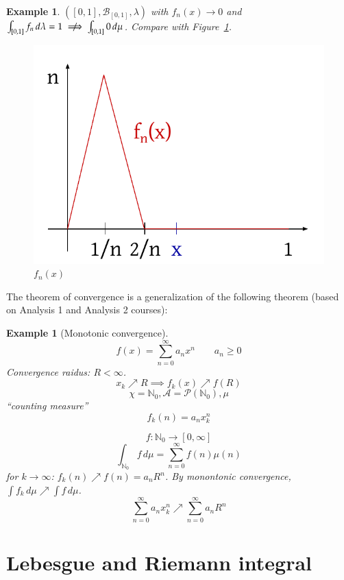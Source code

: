 \documentclass[a4paper]{article}
\newcounter{lecref}[section]
\numberwithin{lecref}{section}
\theoremstyle{break}
\newtheorem{example}[lecref]{Example}
\begin{document}
\begin{example}
  $([0, 1], \mathcal B_{[0,1]}, \lambda)$ with $f_n(x) \to 0$ and $\int_{[0,1]} f_n \, d\lambda = 1 \centernot{\implies} \int_{[0,1]} 0 \, d\mu$.
  Compare with Figure~\ref{img:exconv}.

  \begin{figure}
    \begin{center}
      \includegraphics{img/03_convergence.pdf}
      \caption{$f_n(x)$}
      \label{img:exconv}
    \end{center}
  \end{figure}
\end{example}

The theorem of convergence is a generalization of the following theorem (based on Analysis 1 and Analysis 2 courses):

\begin{example}[Monotonic convergence]
  \[ f(x) = \sum_{n=0}^\infty a_n x^n \qquad a_n \geq 0 \]
  Convergence raidus: $R < \infty$.
  \[ x_k \nearrow R \implies f_k(x) \nearrow f(R) \]
  \[ \chi = \mathbb N_0, \mathcal A = \mathcal P(\mathbb N_0), \mu \]
  \enquote{counting measure}
  \[ f_k(n) = a_n x_k^n \]

  \[ f: \mathbb N_0 \to [0, \infty] \]
  \[ \int_{\mathbb N_0} f \, d\mu = \sum_{n=0}^\infty f(n) \mu(n) \]
  for $k \to \infty$: $f_k(n) \nearrow f(n) = a_n R^n$.
  By monontonic convergence, $\int f_k \, d\mu \nearrow \int f \, d\mu$.
  \[ \sum_{n=0}^\infty a_n x_k^n \nearrow \sum_{n=0}^\infty a_n R^n \]
\end{example}

\section{Lebesgue and Riemann integral}
\end{document}
